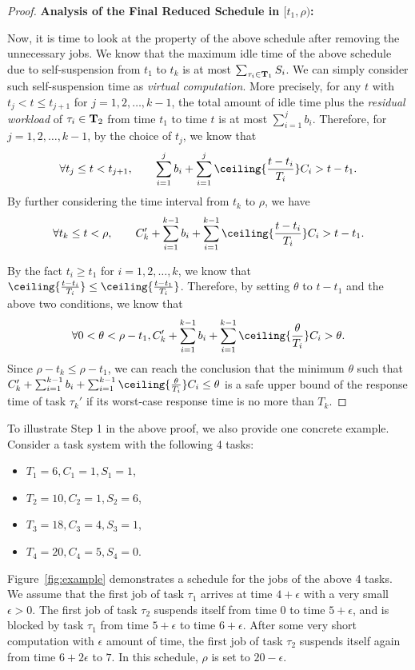 \begin{proof}
{\bf Analysis of the Final Reduced Schedule in $[t_1, \rho)$:}


Now, it is time to look at the property of the above schedule after removing the unnecessary jobs. We know that the maximum idle time of the above schedule due to self-suspension from $t_1$ to $t_k$ is at most $\sum_{\tau_i \in {\bf T}_1} S_i$.  We can simply consider such self-suspension time as \emph{virtual computation}.  More precisely, for any $t$ with  $t_j < t \leq t_{j+1}$ for $j=1,2,\ldots,k-1$, the total amount of idle time plus the \emph{residual workload} of $\tau_i \in {\bf T}_2$ from time $t_1$ to time $t$ is at most $\sum_{i=1}^{j} b_i$. 
Therefore, for $j=1,2,\ldots,k-1$, by the choice of $t_j$, we know that
\[
\forall t_j \leq t < t_{j+1},\qquad  \sum_{i=1}^{j} b_i + \sum_{i=1}^j \ceiling{\frac{t- t_i}{T_i} } C_i >  t-t_1.
\]
By further considering the time interval from $t_k$ to $\rho$, we have
\[
\forall t_k \leq t < \rho,\qquad  C_k'+\sum_{i=1}^{k-1} b_i + \sum_{i=1}^{k-1} \ceiling{\frac{t- t_i}{T_i} } C_i > t-t_1.
\]

By the fact $t_i \geq t_1$ for $i=1,2,\ldots,k$, we know that $\ceiling{\frac{t- t_i}{T_i} } \leq \ceiling{\frac{t- t_1}{T_i} }$. Therefore, by setting $\theta$ to $t-t_1$ and the above two conditions, we know that
\[
\forall 0 < \theta < \rho-t_1 , C_k'+\sum_{i=1}^{k-1} b_i + \sum_{i=1}^{k-1} \ceiling{\frac{\theta}{T_i} } C_i > \theta.
\]
Since $\rho-t_k \leq \rho-t_1$, we can reach the conclusion that the minimum $\theta$ such that $C_k'+\sum_{i=1}^{k-1} b_i + \sum_{i=1}^{k-1} \ceiling{\frac{\theta}{T_i} } C_i \leq \theta$ is a safe upper bound of the response time of task $\tau_k'$ if its worst-case response time is no more than $T_k$.
\end{proof}
  
To illustrate Step 1 in the above proof, we also provide one concrete example. Consider a task system with the following 4 tasks:
\begin{itemize}
\item $T_1 = 6, C_1 = 1, S_1 = 1$,
\item $T_2 = 10, C_2 = 1, S_2 = 6$,
\item $T_3 = 18, C_3 = 4, S_3 = 1$,
\item $T_4 = 20, C_4 = 5, S_4 = 0$.
\end{itemize}

Figure~\ref{fig:example} demonstrates a schedule for the jobs of the
above 4 tasks. We assume that the first job of task $\tau_1$ arrives
at time $4+\epsilon$ with a very small $\epsilon > 0$. The first job
of task $\tau_2$ suspends itself from time $0$ to time $5+\epsilon$,
and is blocked by task $\tau_1$ from time $5+\epsilon$ to time
$6+\epsilon$. After some very short computation with $\epsilon$ amount
of time, the first job of task $\tau_2$ suspends itself again from
time $6+2\epsilon$ to $7$.   In this schedule, $\rho$ is set to $20-\epsilon$.


